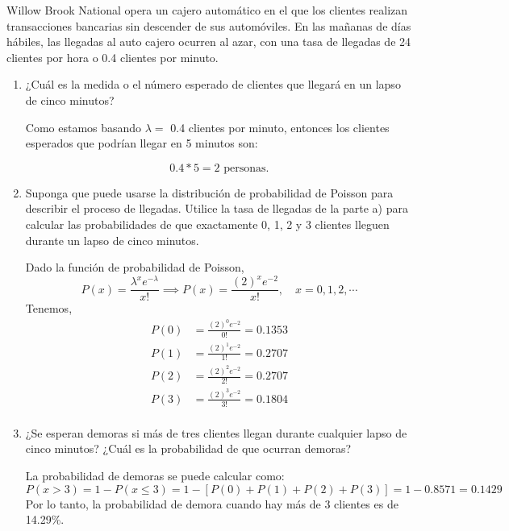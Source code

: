 





\begin{problema}
	Willow Brook National opera un cajero automático en el que los clientes realizan transacciones bancarias sin descender de sus automóviles. En las mañanas de días hábiles, las llegadas al auto cajero ocurren al azar, con una tasa de llegadas de 24 clientes por hora o 0.4 clientes por minuto.
	\begin{enumerate}
		\item ¿Cuál es la medida o el número esperado de clientes que llegará en un lapso de cinco minutos?
		\begin{sol}
			Como estamos basando $\lambda=$ 0.4 clientes por minuto, entonces los clientes esperados que podrían llegar en 5 minutos son: 
			
			$$0.4*5= 2 \text{ personas.}$$
			
		
		\end{sol}
		\item Suponga que puede usarse la distribución de probabilidad de Poisson para describir el proceso de llegadas. Utilice la tasa de llegadas de la parte a) para calcular las probabilidades de que exactamente 0, 1, 2 y 3 clientes lleguen durante un lapso de cinco minutos.
		\begin{sol}
			Dado la función de probabilidad de Poisson, 
			$$P(x)=\frac{\lambda^x e^{-\lambda}}{x!}\implies P(x)=\frac{(2)^x e^{-2}}{x!}, \quad x=0,1,2,\cdots$$
			Tenemos, 
			\begin{align*}
				P(0) &= \frac{(2)^0 e^{-2}}{0!}=0.1353 \\
				P(1) &= \frac{(2)^1 e^{-2}}{1!}= 0.2707\\
				P(2) &= \frac{(2)^2 e^{-2}}{2!}=0.2707\\
				P(3) &= \frac{(2)^3 e^{-2}}{3!}= 0.1804\\
			\end{align*}
		\end{sol}
		\item ¿Se esperan demoras si más de tres clientes llegan durante cualquier lapso de cinco minutos? ¿Cuál es la probabilidad de que ocurran demoras?
		\begin{sol}
			La probabilidad de demoras se puede calcular como: 
			$$P(x>3)= 1- P(x\leq 3)= 1- [P(0)+P(1)+P(2)+P(3)]= 1- 0.8571= 0.1429$$
			Por lo tanto, la probabilidad de demora cuando hay más de 3 clientes es de 14.29\%.  
		\end{sol}
	\end{enumerate}	
\end{problema}


